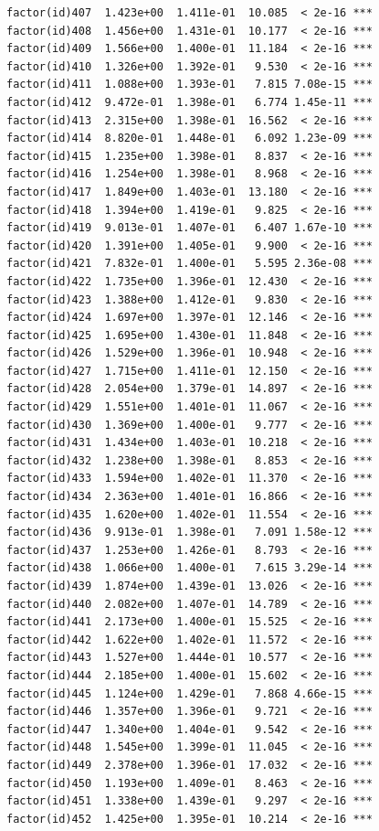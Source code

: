 \documentclass[]{book}
\begin{document}
\begin{verbatim}
factor(id)407  1.423e+00  1.411e-01  10.085  < 2e-16 ***
factor(id)408  1.456e+00  1.431e-01  10.177  < 2e-16 ***
factor(id)409  1.566e+00  1.400e-01  11.184  < 2e-16 ***
factor(id)410  1.326e+00  1.392e-01   9.530  < 2e-16 ***
factor(id)411  1.088e+00  1.393e-01   7.815 7.08e-15 ***
factor(id)412  9.472e-01  1.398e-01   6.774 1.45e-11 ***
factor(id)413  2.315e+00  1.398e-01  16.562  < 2e-16 ***
factor(id)414  8.820e-01  1.448e-01   6.092 1.23e-09 ***
factor(id)415  1.235e+00  1.398e-01   8.837  < 2e-16 ***
factor(id)416  1.254e+00  1.398e-01   8.968  < 2e-16 ***
factor(id)417  1.849e+00  1.403e-01  13.180  < 2e-16 ***
factor(id)418  1.394e+00  1.419e-01   9.825  < 2e-16 ***
factor(id)419  9.013e-01  1.407e-01   6.407 1.67e-10 ***
factor(id)420  1.391e+00  1.405e-01   9.900  < 2e-16 ***
factor(id)421  7.832e-01  1.400e-01   5.595 2.36e-08 ***
factor(id)422  1.735e+00  1.396e-01  12.430  < 2e-16 ***
factor(id)423  1.388e+00  1.412e-01   9.830  < 2e-16 ***
factor(id)424  1.697e+00  1.397e-01  12.146  < 2e-16 ***
factor(id)425  1.695e+00  1.430e-01  11.848  < 2e-16 ***
factor(id)426  1.529e+00  1.396e-01  10.948  < 2e-16 ***
factor(id)427  1.715e+00  1.411e-01  12.150  < 2e-16 ***
factor(id)428  2.054e+00  1.379e-01  14.897  < 2e-16 ***
factor(id)429  1.551e+00  1.401e-01  11.067  < 2e-16 ***
factor(id)430  1.369e+00  1.400e-01   9.777  < 2e-16 ***
factor(id)431  1.434e+00  1.403e-01  10.218  < 2e-16 ***
factor(id)432  1.238e+00  1.398e-01   8.853  < 2e-16 ***
factor(id)433  1.594e+00  1.402e-01  11.370  < 2e-16 ***
factor(id)434  2.363e+00  1.401e-01  16.866  < 2e-16 ***
factor(id)435  1.620e+00  1.402e-01  11.554  < 2e-16 ***
factor(id)436  9.913e-01  1.398e-01   7.091 1.58e-12 ***
factor(id)437  1.253e+00  1.426e-01   8.793  < 2e-16 ***
factor(id)438  1.066e+00  1.400e-01   7.615 3.29e-14 ***
factor(id)439  1.874e+00  1.439e-01  13.026  < 2e-16 ***
factor(id)440  2.082e+00  1.407e-01  14.789  < 2e-16 ***
factor(id)441  2.173e+00  1.400e-01  15.525  < 2e-16 ***
factor(id)442  1.622e+00  1.402e-01  11.572  < 2e-16 ***
factor(id)443  1.527e+00  1.444e-01  10.577  < 2e-16 ***
factor(id)444  2.185e+00  1.400e-01  15.602  < 2e-16 ***
factor(id)445  1.124e+00  1.429e-01   7.868 4.66e-15 ***
factor(id)446  1.357e+00  1.396e-01   9.721  < 2e-16 ***
factor(id)447  1.340e+00  1.404e-01   9.542  < 2e-16 ***
factor(id)448  1.545e+00  1.399e-01  11.045  < 2e-16 ***
factor(id)449  2.378e+00  1.396e-01  17.032  < 2e-16 ***
factor(id)450  1.193e+00  1.409e-01   8.463  < 2e-16 ***
factor(id)451  1.338e+00  1.439e-01   9.297  < 2e-16 ***
factor(id)452  1.425e+00  1.395e-01  10.214  < 2e-16 ***

\end{verbatim}
\end{document}
